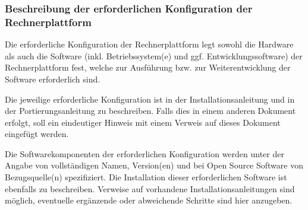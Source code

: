 \subsubsection*{Beschreibung der erforderlichen Konfiguration der Rechnerplattform}

Die erforderliche Konfiguration der Rechnerplattform legt sowohl die Hardware als auch die Software (inkl. Betriebssystem(e) und ggf. Entwicklungssoftware) der Rechnerplattform fest, welche zur Ausführung bzw. zur Weiterentwicklung der Software erforderlich sind.

Die jeweilige erforderliche Konfiguration ist in der Installationsanleitung und in der Portierungsanleitung zu beschreiben. Falls dies in einem anderen Dokument erfolgt, soll ein eindeutiger Hinweis mit einem Verweis auf dieses Dokument eingefügt werden.

Die Softwarekomponenten der erforderlichen Konfiguration werden unter der Angabe von vollständigen Namen, Version(en) und bei Open Source Software von Bezugsquelle(n) spezifiziert. Die Installation dieser erforderlichen Software ist ebenfalls zu beschreiben. Verweise auf vorhandene Installationsanleitungen sind möglich, eventuelle ergänzende oder abweichende Schritte sind hier anzugeben.

